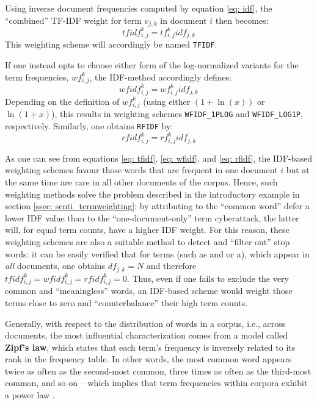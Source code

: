 Using inverse document frequencies computed by equation \eqref{eq: idf}, the \enquote{combined} TF-IDF weight for term $v_{j,k}$ in document $i$ then becomes:
\begin{equation} \label{eq: tfidf}
tfidf_{i,j}^k = tf_{i,j}^k idf_{j,k}
\end{equation}
This weighting scheme will accordingly be named \texttt{TFIDF}.

If one instead opts to choose either form of the log-normalized variants for the term frequencies,  $wf_{i,j}^k$, the IDF-method accordingly defines:
\begin{equation} \label{eq: wfidf}
wfidf_{i,j}^k = wf_{i,j}^k idf_{j,k}
\end{equation}
Depending on the definition of $wf_{i,j}^k$ (using either $(1+\ln(x))$ or $\ln(1+x)$), this results in weighting schemes \texttt{WFIDF\_1PLOG} and \texttt{WFIDF\_LOG1P}, respectively. Similarly, one obtains \texttt{RFIDF} by:
\begin{equation} \label{eq: rfidf}
rfidf_{i,j}^k = rf_{i,j}^k idf_{j,k}
\end{equation}

As one can see from equations \eqref{eq: tfidf}, \eqref{eq: wfidf}, and \eqref{eq: rfidf}, the IDF-based weighting schemes favour those words that are frequent in one document $i$ but at the same time are rare in all other documents of the corpus. Hence, such weighting methods solve the problem described in the introductory example in section \ref{ssec: senti_termweighting}: by attributing to the \enquote{common word} \textsf{defer} a lower IDF value than to the \enquote{one-document-only} term \textsf{cyberattack}, the latter will, for equal term counts, have a higher IDF weight. For this reason, these weighting schemes are also a suitable method to detect and \enquote{filter out} stop words: it can be easily verified that for terms (such as \textsf{and} or \textsf{a}), which appear in \textit{all} documents, one obtains $df_{j,k}= N$ and therefore $tfidf_{i,j}^k= wfidf_{i,j}^k = rfidf_{i,j}^k = 0$. Thus, even if one fails to exclude the very common and \enquote{meaningless} words, an IDF-based scheme would weight those terms close to zero and \enquote{counterbalance} their high term counts. 

Generally, with respect to the distribution of words in a corpus, i.e., across documents, the most influential characterization comes from a model called \textbf{Zipf's law}, which states that each term's frequency is inversely related to its rank in the frequency table. In other words, the most common word appears twice as often as the second-most common, three times as often as the third-most common, and so on -- which implies that term frequencies within corpora exhibit a power law \parencite[89]{ManningSchutze_IR_2008}. 

